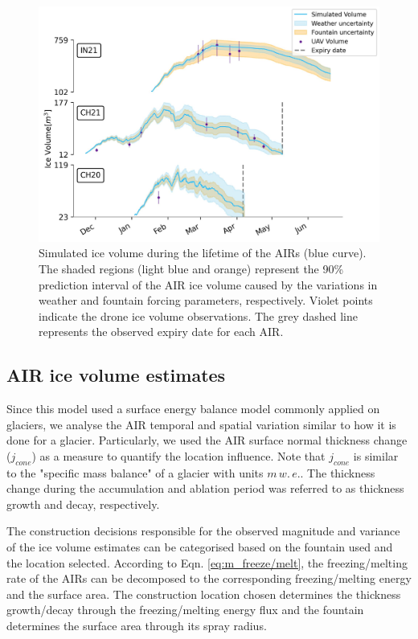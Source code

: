 \documentclass[utf8]{frontiersSCNS}
\begin{document}
\begin{figure}
	\begin{center}
		\includegraphics[width=\linewidth]{Figures/Figure_6.jpg}
	\end{center}
	\caption{Simulated ice volume during the lifetime of the AIRs (blue curve). The shaded regions (light blue and
		orange) represent the 90\% prediction interval of the AIR ice volume caused by the variations in weather and
    fountain forcing parameters, respectively. Violet points indicate the drone ice volume observations.  The grey
  dashed line represents the observed expiry date for each AIR.  }
	\label{fig:results}
\end{figure}

\subsection{AIR ice volume estimates}

Since this model used a surface energy balance model commonly applied on glaciers, we analyse the AIR temporal
and spatial variation similar to how it is done for a glacier. Particularly, we used the AIR surface normal
thickness change ($j_{cone}$) as a measure to quantify the location influence. Note that $j_{cone}$ is similar
to the "specific mass balance" of a glacier with units $m \, w.\, e.$. The thickness change during the
accumulation and ablation period was referred to as thickness growth and decay, respectively.

The construction decisions responsible for the observed magnitude and variance of the ice volume estimates can
be categorised based on the fountain used and the location selected. According to Eqn.  \ref{eq:m_freeze/melt},
the freezing/melting rate of the AIRs can be decomposed to the corresponding freezing/melting energy and the
surface area. The construction location chosen determines the thickness growth/decay through the
freezing/melting energy flux and the fountain determines the surface area through its spray radius.
\end{document}
